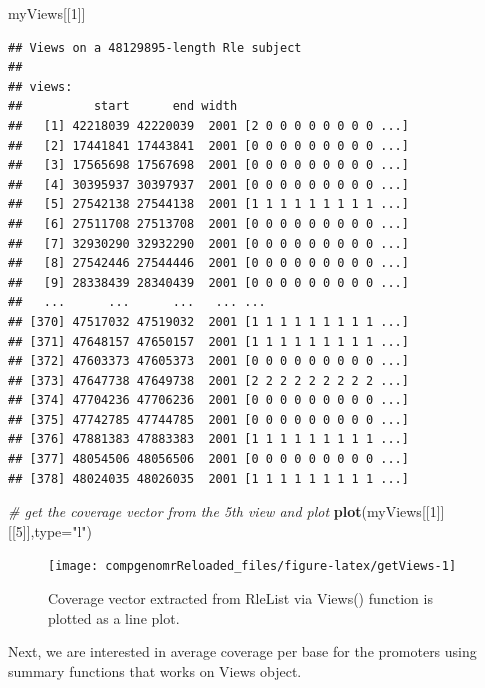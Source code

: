 \documentclass[12pt,]{krantz}
\newenvironment{Shaded}{\begin{snugshade}}{\end{snugshade}}
\newcommand{\CommentTok}[1]{\textcolor[rgb]{0.56,0.35,0.01}{\textit{#1}}}
\newcommand{\DataTypeTok}[1]{\textcolor[rgb]{0.13,0.29,0.53}{#1}}
\newcommand{\DecValTok}[1]{\textcolor[rgb]{0.00,0.00,0.81}{#1}}
\newcommand{\KeywordTok}[1]{\textcolor[rgb]{0.13,0.29,0.53}{\textbf{#1}}}
\newcommand{\NormalTok}[1]{#1}
\newcommand{\StringTok}[1]{\textcolor[rgb]{0.31,0.60,0.02}{#1}}
\begin{document}
\begin{Shaded}
\begin{Highlighting}[]
\NormalTok{myViews[[}\DecValTok{1}\NormalTok{]]}
\end{Highlighting}
\end{Shaded}

\begin{verbatim}
## Views on a 48129895-length Rle subject
## 
## views:
##          start      end width
##   [1] 42218039 42220039  2001 [2 0 0 0 0 0 0 0 0 ...]
##   [2] 17441841 17443841  2001 [0 0 0 0 0 0 0 0 0 ...]
##   [3] 17565698 17567698  2001 [0 0 0 0 0 0 0 0 0 ...]
##   [4] 30395937 30397937  2001 [0 0 0 0 0 0 0 0 0 ...]
##   [5] 27542138 27544138  2001 [1 1 1 1 1 1 1 1 1 ...]
##   [6] 27511708 27513708  2001 [0 0 0 0 0 0 0 0 0 ...]
##   [7] 32930290 32932290  2001 [0 0 0 0 0 0 0 0 0 ...]
##   [8] 27542446 27544446  2001 [0 0 0 0 0 0 0 0 0 ...]
##   [9] 28338439 28340439  2001 [0 0 0 0 0 0 0 0 0 ...]
##   ...      ...      ...   ... ...
## [370] 47517032 47519032  2001 [1 1 1 1 1 1 1 1 1 ...]
## [371] 47648157 47650157  2001 [1 1 1 1 1 1 1 1 1 ...]
## [372] 47603373 47605373  2001 [0 0 0 0 0 0 0 0 0 ...]
## [373] 47647738 47649738  2001 [2 2 2 2 2 2 2 2 2 ...]
## [374] 47704236 47706236  2001 [0 0 0 0 0 0 0 0 0 ...]
## [375] 47742785 47744785  2001 [0 0 0 0 0 0 0 0 0 ...]
## [376] 47881383 47883383  2001 [1 1 1 1 1 1 1 1 1 ...]
## [377] 48054506 48056506  2001 [0 0 0 0 0 0 0 0 0 ...]
## [378] 48024035 48026035  2001 [1 1 1 1 1 1 1 1 1 ...]
\end{verbatim}

\begin{Shaded}
\begin{Highlighting}[]
\CommentTok{# get the coverage vector from the 5th view and plot}
\KeywordTok{plot}\NormalTok{(myViews[[}\DecValTok{1}\NormalTok{]][[}\DecValTok{5}\NormalTok{]],}\DataTypeTok{type=}\StringTok{"l"}\NormalTok{)}
\end{Highlighting}
\end{Shaded}

\begin{figure}

{\centering \texttt{[image: compgenomrReloaded\_files/figure-latex/getViews-1]} 

}

\caption{Coverage vector extracted from RleList via Views() function is plotted as a line plot.}\label{fig:getViews}
\end{figure}

Next, we are interested in average coverage per base for the promoters using summary
functions that works on Views object.
\end{document}
